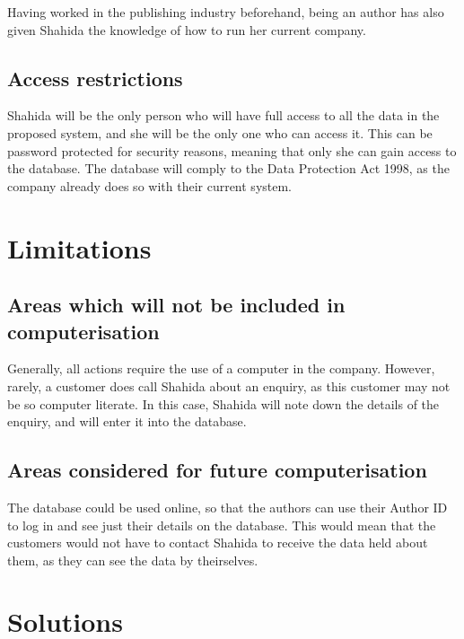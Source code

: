 Having worked in the publishing industry beforehand, being an author has also given Shahida the knowledge of how to run her current company. 

\subsection{Access restrictions}

Shahida will be the only person who will have full access to all the data in the proposed system, and she will be the only one who can access it. This can be password protected for security reasons, meaning that only she can gain access to the database. The database will comply to the Data Protection Act 1998, as the company already does so with their current system.

\section{Limitations}

\subsection{Areas which will not be included in computerisation}
Generally, all actions require the use of a computer in the company. However, rarely, a customer does call Shahida about an enquiry, as this customer may not be so computer literate. In this case, Shahida will note down the details of the enquiry, and will enter it into the database.
\subsection{Areas considered for future computerisation}

The database could be used online, so that the authors can use their Author ID to log in and see just their details on the database. This would mean that the customers would not have to contact Shahida to receive the data held about them, as they can see the data by theirselves.

\section{Solutions}

